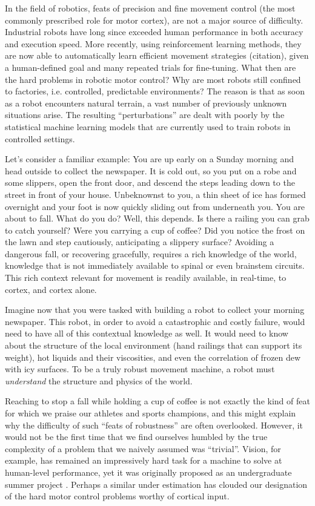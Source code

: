 In the field of robotics, feats of precision and fine movement control (the most commonly prescribed role for motor cortex), are not a major source of difficulty. Industrial robots have long since exceeded human performance in both accuracy and execution speed. More recently, using reinforcement learning methods, they are now able to automatically learn efficient movement strategies (citation), given a human-defined goal and many repeated trials for fine-tuning. What then are the hard problems in robotic motor control? Why are most robots still confined to factories, i.e. controlled, predictable environments? The reason is that as soon as a robot encounters natural terrain, a vast number of previously unknown situations arise. The resulting ``perturbations'' are dealt with poorly by the statistical machine learning models that are currently used to train robots in controlled settings.

Let’s consider a familiar example: You are up early on a Sunday morning and head outside to collect the newspaper. It is cold out, so you put on a robe and some slippers, open the front door, and descend the steps leading down to the street in front of your house. Unbeknownst to you, a thin sheet of ice has formed overnight and your foot is now quickly sliding out from underneath you. You are about to fall. What do you do? Well, this depends. Is there a railing you can grab to catch yourself? Were you carrying a cup of coffee? Did you notice the frost on the lawn and step cautiously, anticipating a slippery surface? Avoiding a dangerous fall, or recovering gracefully, requires a rich knowledge of the world, knowledge that is not immediately available to spinal or even brainstem circuits. This rich context relevant for movement is readily available, in real-time, to cortex, and cortex alone.

Imagine now that you were tasked with building a robot to collect your morning newspaper. This robot, in order to avoid a catastrophic and costly failure, would need to have all of this contextual knowledge as well. It would need to know about the structure of the local environment (hand railings that can support its weight), hot liquids and their viscosities, and even the correlation of frozen dew with icy surfaces. To be a truly robust movement machine, a robot must \emph{understand} the structure and physics of the world.

Reaching to stop a fall while holding a cup of coffee is not exactly the kind of feat for which we praise our athletes and sports champions, and this might explain why the difficulty of such ``feats of robustness'' are often overlooked. However, it would not be the first time that we find ourselves humbled by the true complexity of a problem that we naively assumed was ``trivial''. Vision, for example, has remained an impressively hard task for a machine to solve at human-level performance, yet it was originally proposed as an undergraduate summer project \cite{Papert1966}. Perhaps a similar under estimation has clouded our designation of the hard motor control problems worthy of cortical input. 

